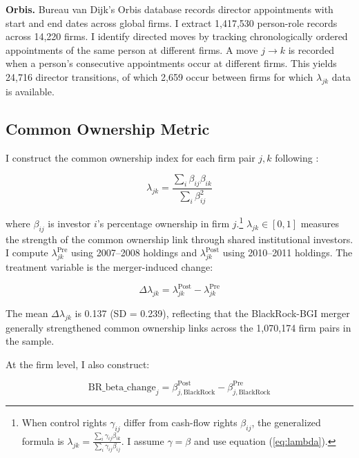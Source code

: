 \documentclass[11pt,a4paper]{article}
\begin{document}
\textbf{Orbis.} Bureau van Dijk's Orbis database records director appointments with start and end dates across global firms. I extract 1,417,530 person-role records across 14,220 firms. I identify directed moves by tracking chronologically ordered appointments of the same person at different firms. A move $j \to k$ is recorded when a person's consecutive appointments occur at different firms. This yields 24,716 director transitions, of which 2,659 occur between firms for which $\lambda_{jk}$ data is available.

\subsection{Common Ownership Metric}

I construct the common ownership index for each firm pair $j,k$ following \cite{azar2018}:

\begin{equation}\label{eq:lambda}
\lambda_{jk} = \frac{\sum_i \beta_{ij} \beta_{ik}}{\sum_i \beta_{ij}^2}
\end{equation}

where $\beta_{ij}$ is investor $i$'s percentage ownership in firm $j$.\footnote{When control rights $\gamma_{ij}$ differ from cash-flow rights $\beta_{ij}$, the generalized formula is $\lambda_{jk} = \frac{\sum_i \gamma_{ij} \beta_{ik}}{\sum_i \gamma_{ij} \beta_{ij}}$. I assume $\gamma = \beta$ and use equation (\ref{eq:lambda}).} $\lambda_{jk} \in [0,1]$ measures the strength of the common ownership link through shared institutional investors. I compute $\lambda_{jk}^{\text{Pre}}$ using 2007--2008 holdings and $\lambda_{jk}^{\text{Post}}$ using 2010--2011 holdings. The treatment variable is the merger-induced change:

\begin{equation}
\Delta\lambda_{jk} = \lambda_{jk}^{\text{Post}} - \lambda_{jk}^{\text{Pre}}
\end{equation}

The mean $\Delta\lambda_{jk}$ is 0.137 (SD = 0.239), reflecting that the BlackRock-BGI merger generally strengthened common ownership links across the 1,070,174 firm pairs in the sample.

At the firm level, I also construct:

\begin{equation}
\text{BR\_beta\_change}_j = \beta_{j,\text{BlackRock}}^{\text{Post}} - \beta_{j,\text{BlackRock}}^{\text{Pre}}
\end{equation}
\end{document}
